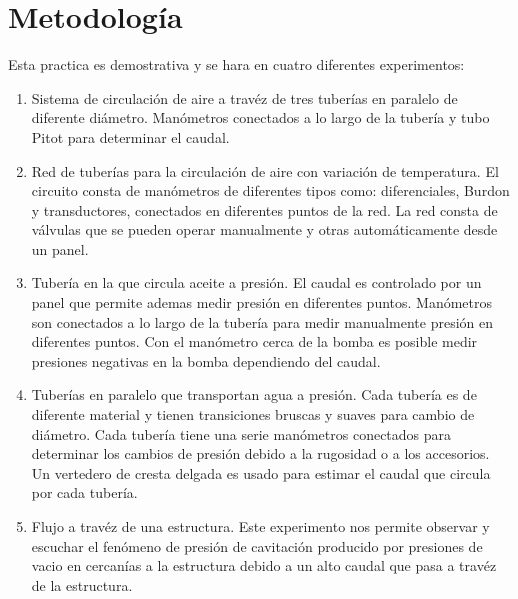 \documentclass[12pt, a4paper]{exam}
\begin{document}
\section{Metodolog\'ia}
Esta practica es demostrativa y se hara en cuatro diferentes experimentos:
\begin{enumerate}
\item Sistema de circulaci\'on de aire a trav\'ez de tres tuber\'ias en paralelo de diferente di\'ametro. Man\'ometros conectados a lo largo de la tuber\'ia y tubo Pitot para determinar el caudal.
\item Red de tuber\'ias para la circulaci\'on de aire con variaci\'on de temperatura. El circuito consta de man\'ometros de diferentes tipos como: diferenciales, Burdon y transductores, conectados en diferentes puntos de la red. La red consta de v\'alvulas que se pueden operar manualmente y otras autom\'aticamente desde un panel.
\item Tuber\'ia en la que circula aceite a presi\'on. El caudal es controlado por un panel que permite ademas medir presi\'on en diferentes puntos. Man\'ometros son conectados a lo largo de la tuber\'ia para medir manualmente presi\'on en diferentes puntos. Con el man\'ometro cerca de la bomba es posible medir presiones negativas en la bomba dependiendo del caudal.   
\item Tuber\'ias en paralelo que transportan agua a presi\'on. Cada tuber\'ia es de diferente material y tienen transiciones bruscas y suaves para cambio de di\'ametro. Cada tuber\'ia tiene una serie man\'ometros conectados para determinar los cambios de presi\'on debido a la rugosidad o a los accesorios. Un vertedero de cresta delgada es usado para estimar el caudal que circula por cada tuber\'ia. 
\item Flujo a trav\'ez de una estructura. Este experimento nos permite observar y escuchar el fen\'omeno de presi\'on de cavitaci\'on producido por presiones de vacio en cercan\'ias a la estructura debido a un alto caudal que pasa a trav\'ez de la estructura.
\end{enumerate}
\end{document}
